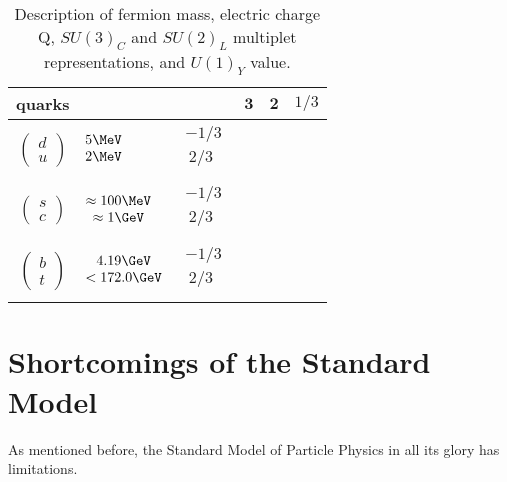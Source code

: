 \begin{table}[!htp]
\begin{tabular}{|cllccc|}
\hline
\textbf{quarks}&&&$\mathbf{3}$ & $\mathbf{2}$ &  $1/3$\\
\hline 
$\begin{pmatrix} d\\ u \end{pmatrix}$
 &$\begin{matrix} 5\MeV\\  2\MeV \\ \end{matrix}$
  &$\begin{matrix} -1/3\\  ~2/3 \\ \end{matrix}$&&&\\  
\hline
$\begin{pmatrix} s\\ c \end{pmatrix}$
&$\begin{matrix}\approx100\MeV \\  \approx1\GeV \\ \end{matrix}$
  &$\begin{matrix} -1/3\\  ~2/3 \\ \end{matrix}$&&&\\  
  \hline
  $\begin{pmatrix} b\\ t \end{pmatrix}$
&$\begin{matrix} 4.19\GeV\\  <172.0\GeV \\ \end{matrix}$
  &$\begin{matrix} -1/3\\  ~2/3 \\ \end{matrix}$&&&\\  
\hline

\hline
\end{tabular}
\caption{Description of fermion mass, electric charge Q, $SU(3)_{C}$ and $SU(2)_{L}$ multiplet representations, and $U(1)_{Y}$ value. }
\label{tab:fermion}
\end{table}  
\FloatBarrier

\section{Shortcomings of the Standard Model}
\label{sec:fail}
As mentioned before, the Standard Model of Particle Physics in all its glory has limitations.

